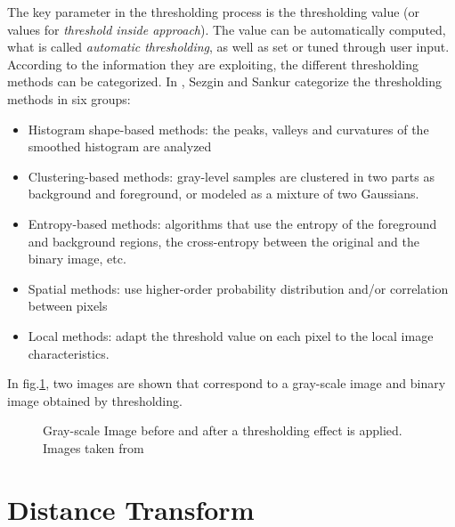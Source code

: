 The key parameter in the thresholding process is the thresholding value (or values for
\emph{threshold inside approach}). The value can be automatically computed, what is called
\emph{automatic thresholding}, as well as set or tuned through user input.\\
According to the information they are exploiting, the different thresholding methods can be 
categorized. In \cite[p.147]{thres}, Sezgin and Sankur categorize the thresholding methods in
six groups:
\begin{itemize}
\item Histogram shape-based methods: the peaks, valleys and curvatures of the smoothed
histogram are analyzed
\item Clustering-based methods: gray-level samples are clustered in two parts as
background and foreground, or modeled as a mixture of two Gaussians.
\item Entropy-based methods: algorithms that use the entropy of the foreground 
and background regions, the cross-entropy between the original and the binary image, 
etc.
\item Spatial methods: use higher-order probability distribution and/or 
correlation between pixels
\item Local methods: adapt the threshold value on each pixel
to the local image characteristics.
\end{itemize}

In fig.\ref{fig:thres1}, two images are shown that correspond to a gray-scale image
and binary image obtained by thresholding.

\begin{figure}[h t b p ! H]
  \centering
\qquad
  \caption{Gray-scale Image before and after a thresholding effect is applied. Images taken from \cite{web:thresholding}}
  \label{fig:thres1}
\end{figure}

\section{Distance Transform}
\label{sec:dt}

